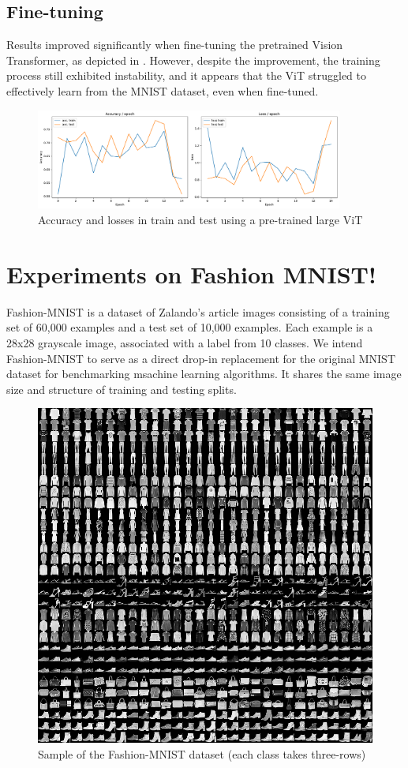 \subsection{Fine-tuning}
Results improved significantly when fine-tuning the pretrained Vision Transformer, as depicted in . However, despite the improvement, the training process still exhibited instability, and it appears that the ViT struggled to effectively learn from the MNIST dataset, even when fine-tuned.
\begin{figure}[H]
    \centering
    \includegraphics*[width=0.9\textwidth]{figs/Transformers/stats_vit_pretrained_15.pdf}
    \caption{Accuracy and losses in train and test using a pre-trained large ViT}
    \label{fig:stats_vit_pretrained}
\end{figure}

\section{Experiments on Fashion MNIST!}
Fashion-MNIST is a dataset of Zalando's article images consisting of a training set of 60,000 examples and a test set of 10,000 examples. Each example is a 28x28 grayscale image, associated with a label from 10 classes. We intend Fashion-MNIST to serve as a direct drop-in replacement for the original MNIST dataset for benchmarking msachine learning algorithms. It shares the same image size and structure of training and testing splits.

\begin{figure}[H]
    \centering
    \includegraphics*[width=.4\textwidth]{figs/Transformers/fashion-mnist-sprite.png}
    \caption{Sample of the Fashion-MNIST dataset (each class takes three-rows)}
\end{figure}

